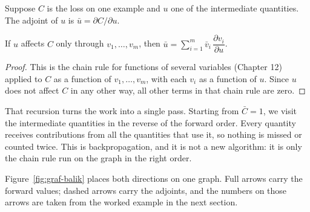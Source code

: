 
\begin{definisi}[Adjoint]
Suppose $C$ is the loss on one example and $u$ one of the intermediate quantities. The adjoint of
$u$ is $\bar{u}=\partial C/\partial u$.
\end{definisi}

\begin{proposisi}
If $u$ affects $C$ only through $v_{1},\dots,v_{m}$, then
$\bar{u}=\sum_{i=1}^{m}\bar{v}_{i}\,\dfrac{\partial v_{i}}{\partial u}$.
\end{proposisi}

\begin{proof}
This is the chain rule for functions of several variables (Chapter 12) applied to $C$ as a
function of $v_{1},\dots,v_{m}$, with each $v_{i}$ as a function of $u$. Since $u$ does not
affect $C$ in any other way, all other terms in that chain rule are zero.
\end{proof}

That recursion turns the work into a single pass. Starting from $\bar{C}=1$, we visit the
intermediate quantities in the reverse of the forward order. Every quantity receives
contributions from all the quantities that use it, so nothing is missed or counted twice. This
is backpropagation, and it is not a new algorithm: it is only the chain rule run on the graph in
the right order.

Figure~\ref{fig:graf-balik} places both directions on one graph. Full arrows carry the forward
values; dashed arrows carry the adjoints, and the numbers on those arrows are taken from the
worked example in the next section.

